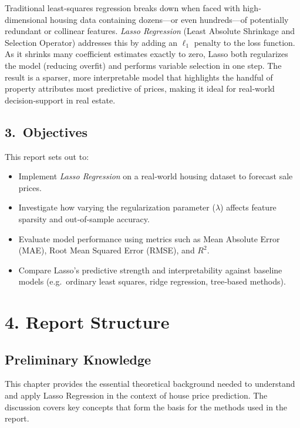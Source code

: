 \documentclass[12pt, a4paper]{report}
\begin{document}
\noindent
\par Traditional least‐squares regression breaks down when faced with high‐dimensional housing data containing dozens—or even hundreds—of potentially redundant or collinear features. \textit{Lasso Regression} (Least Absolute Shrinkage and Selection Operator) addresses this by adding an $\ell_{1}$ penalty to the loss function. As it shrinks many coefficient estimates exactly to zero, Lasso both regularizes the model (reducing overfit) and performs variable selection in one step. The result is a sparser, more interpretable model that highlights the handful of property attributes most predictive of prices, making it ideal for real‐world decision‐support in real estate.

\bigskip

\subsection*{3.~Objectives}

\noindent
This report sets out to:
\begin{itemize}
  \item Implement \textit{Lasso Regression} on a real‐world housing dataset to forecast sale prices.
  \item Investigate how varying the regularization parameter ($\lambda$) affects feature sparsity and out‐of‐sample accuracy.
  \item Evaluate model performance using metrics such as Mean Absolute Error (MAE), Root Mean Squared Error (RMSE), and $R^2$.
  \item Compare Lasso’s predictive strength and interpretability against baseline models (e.g.\ ordinary least squares, ridge regression, tree‐based methods).
\end{itemize}


\section*{4. Report Structure}
\subsection*{Preliminary Knowledge}

This chapter provides the essential theoretical background needed to understand and apply Lasso Regression in the context of house price prediction. The discussion covers key concepts that form the basis for the methods used in the report.
\end{document}
